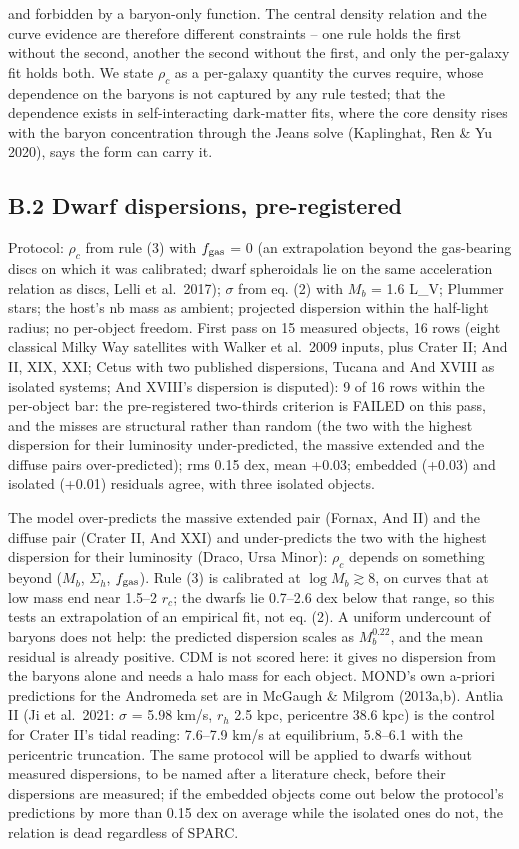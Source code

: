 \documentclass[
  10pt,
]{article}
\begin{document}
and forbidden by a baryon-only function. The central density relation and the curve evidence are therefore different constraints -- one rule holds the first without the second, another the second without the first, and only the per-galaxy fit holds both. We state $\rho_c$ as a per-galaxy quantity the curves require, whose dependence on the baryons is not captured by any rule tested; that the dependence exists in self-interacting dark-matter fits, where the core density rises with the baryon concentration through the Jeans solve (Kaplinghat, Ren \& Yu 2020), says the form can carry it.

\subsection{B.2 Dwarf dispersions, pre-registered}

Protocol: $\rho_c$ from rule (3) with $f_{\rm gas}$ = 0 (an extrapolation beyond the gas-bearing discs on which it was calibrated; dwarf spheroidals lie on the same acceleration relation as discs, Lelli et al.~2017); $\sigma$ from eq. (2) with $M_b$ = 1.6 L\_V; Plummer stars; the host's nb mass as ambient; projected dispersion within the half-light radius; no per-object freedom. First pass on 15 measured objects, 16 rows (eight classical Milky Way satellites with Walker et al.~2009 inputs, plus Crater II; And II, XIX, XXI; Cetus with two published dispersions, Tucana and And XVIII as isolated systems; And XVIII's dispersion is disputed): 9 of 16 rows within the per-object bar: the pre-registered two-thirds criterion is FAILED on this pass, and the misses are structural rather than random (the two with the highest dispersion for their luminosity under-predicted, the massive extended and the diffuse pairs over-predicted); rms 0.15 dex, mean +0.03; embedded (+0.03) and isolated (+0.01) residuals agree, with three isolated objects.

The model over-predicts the massive extended pair (Fornax, And II) and the diffuse pair (Crater II, And XXI) and under-predicts the two with the highest dispersion for their luminosity (Draco, Ursa Minor): $\rho_c$ depends on something beyond ($M_b$, $\Sigma_h$, $f_{\rm gas}$). Rule (3) is calibrated at $\log M_b \gtrsim 8$, on curves that at low mass end near 1.5--2 $r_c$; the dwarfs lie 0.7--2.6 dex below that range, so this tests an extrapolation of an empirical fit, not eq. (2). A uniform undercount of baryons does not help: the predicted dispersion scales as $M_b^{0.22}$, and the mean residual is already positive. CDM is not scored here: it gives no dispersion from the baryons alone and needs a halo mass for each object. MOND's own a-priori predictions for the Andromeda set are in McGaugh \& Milgrom (2013a,b). Antlia II (Ji et al.~2021: $\sigma$ = 5.98 km/s, $r_h$ 2.5 kpc, pericentre 38.6 kpc) is the control for Crater II's tidal reading: 7.6--7.9 km/s at equilibrium, 5.8--6.1 with the pericentric truncation. The same protocol will be applied to dwarfs without measured dispersions, to be named after a literature check, before their dispersions are measured; if the embedded objects come out below the protocol's predictions by more than 0.15 dex on average while the isolated ones do not, the relation is dead regardless of SPARC.
\end{document}
